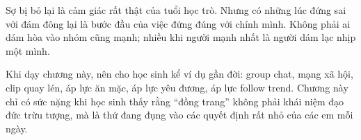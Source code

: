 \begin{tongketchuong}
Sợ bị bỏ lại là cảm giác rất thật của tuổi học trò. Nhưng có những lúc đứng sai với đám đông lại là bước đầu của việc đứng đúng với chính mình. Không phải ai dám hòa vào nhóm cũng mạnh; nhiều khi người mạnh nhất là người dám lạc nhịp một mình.
\end{tongketchuong}

\begin{goigiaovien}
Khi dạy chương này, nên cho học sinh kể ví dụ gần đời: group chat, mạng xã hội, clip quay lén, áp lực ăn mặc, áp lực yêu đương, áp lực follow trend. Chương này chỉ có sức nặng khi học sinh thấy rằng ``đồng trang'' không phải khái niệm đạo đức trừu tượng, mà là thứ đang đụng vào các quyết định rất nhỏ của các em mỗi ngày.
\end{goigiaovien}

\ngancach